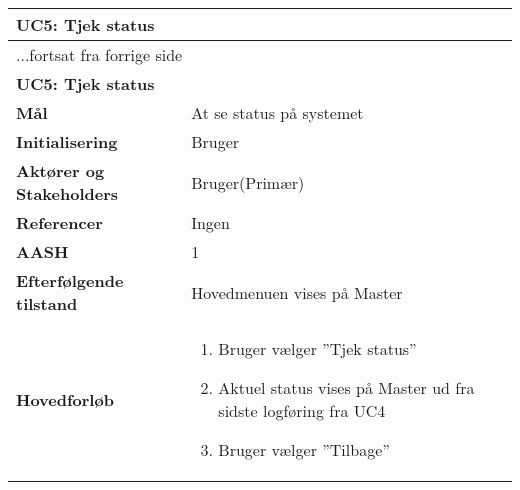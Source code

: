 \begin{center} \centering \label{UC5}
	\begin{longtable}{|p{5cm}|p{9cm}|}  %
	\hline
		\multicolumn{2}{|l|}{\textbf{UC5: Tjek status}} \\\hline %
		\endfirsthead
		
		\multicolumn{2}{l}{...fortsat fra forrige side} \\ \hline %
		\multicolumn{2}{|l|}{\textbf{UC5: Tjek status}} \\\hline %
		\endhead	
		
		\textbf{Mål}								&At se status på systemet			\\\hline
		\textbf{Initialisering}					&Bruger							\\\hline
		\textbf{Aktører og Stakeholders}			&Bruger(Primær)					\\\hline
		\textbf{Referencer}						&Ingen							\\\hline
		\textbf{AASH}							&1								\\\hline
		\textbf{Efterfølgende tilstand}			&Hovedmenuen vises på Master			\\\hline
		\textbf{Hovedforløb}					
			&\begin{enumerate}
	
				\item Bruger vælger ''Tjek status''
				
				\item Aktuel status vises på Master ud fra sidste logføring fra UC4
				
				\item Bruger vælger ''Tilbage''
	
			\end{enumerate}\\\hline
	\end{longtable} 
\end{center}

